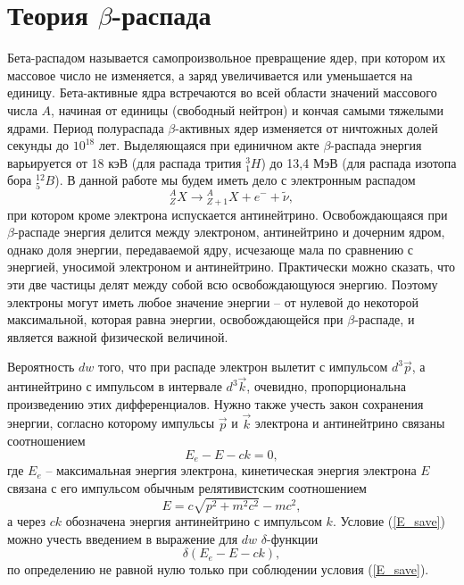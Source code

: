 \documentclass{physlab}
\begin{document}


\section{Теория $\beta$-распада}
Бета-распадом называется самопроизвольное превращение ядер, при котором их массовое число не изменяется, а заряд увеличивается или уменьшается на единицу. Бета-активные ядра встречаются во всей области значений массового числа $A$, начиная от единицы (свободный нейтрон) и кончая самыми тяжелыми ядрами. Период полураспада $\beta$-активных ядер изменяется от ничтожных долей секунды до $10^{18}$ лет. Выделяющаяся при единичном акте $\beta$-распада энергия варьируется от 18 кэВ (для распада трития ${}_1^3H$) до 13,4 МэВ (для распада изотопа бора ${}_5^{12}B$).
В данной работе мы будем иметь дело с электронным распадом 
\begin{equation*}
{}_Z^AX \longrightarrow {}_{Z+1}^AX + e^{-} + \tilde \nu,
\end{equation*}
при котором кроме электрона испускается антинейтрино. Освобождающаяся при $\beta$-распаде энергия делится между электроном, антинейтрино и дочерним ядром, однако доля энергии, передаваемой ядру, исчезающе мала по сравнению с энергией, уносимой электроном и антинейтрино. Практически можно сказать, что эти две частицы делят между собой всю освобождающуюся энергию. Поэтому электроны могут иметь любое значение энергии -- от нулевой до некоторой максимальной, которая равна энергии, освобождающейся при $\beta$-распаде, и является важной физической величиной. 

Вероятность $dw$ того, что при распаде электрон вылетит с импульсом $d^3 \vec{p}$, а антинейтрино с импульсом в интервале $d^3 \vec{k}$, очевидно, пропорциональна произведению этих дифференциалов. Нужно также учесть закон сохранения энергии, согласно которому импульсы $\vec{p}$ и $\vec{k}$ электрона и антинейтрино связаны соотношением 
\begin{equation} \label{E_save}
E_e - E - ck = 0,
\end{equation}
где $E_e$ -- максимальная энергия электрона, кинетическая энергия электрона $E$ связана с его импульсом обычным релятивистским соотношением 
\begin{equation}
E = c \sqrt{p^2 + m^2 c^2} - m c^2, 
\end{equation}
а через $ck$ обозначена энергия антинейтрино с импульсом $k$. Условие (\ref{E_save}) можно учесть введением в выражение для $dw$ $\delta$-функции
\begin{equation}
\delta (E_e - E - ck), 
\end{equation}
по определению не равной нулю только при соблюдении условия (\ref{E_save}).
\end{document}
